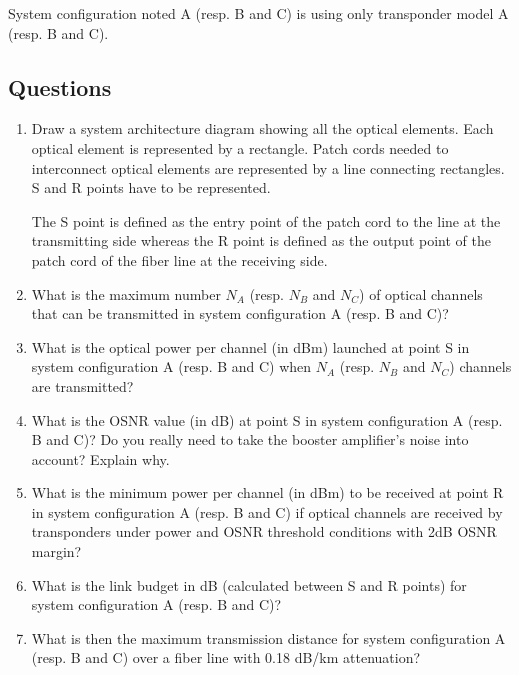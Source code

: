 \documentclass[a4paper,11pt]{article}
\begin{document}
System configuration noted A (resp. B and C) is using only transponder model A (resp. B and C).

\subsection*{Questions}

\begin{enumerate}
    \item Draw a system architecture diagram showing all the optical elements. Each optical element is represented by a rectangle. Patch cords needed to interconnect optical elements are represented by a line connecting rectangles. S and R points have to be represented.
    
    The S point is defined as the entry point of the patch cord to the line at the transmitting side whereas the R point is defined as the output point of the patch cord of the fiber line at the receiving side.
    
    \vspace{4cm}
    
    \item What is the maximum number $N_A$ (resp. $N_B$ and $N_C$) of optical channels that can be transmitted in system configuration A (resp. B and C)?
    
    \vspace{3cm}
    
    \item What is the optical power per channel (in dBm) launched at point S in system configuration A (resp. B and C) when $N_A$ (resp. $N_B$ and $N_C$) channels are transmitted?
    
    \vspace{3cm}
    
    \item What is the OSNR value (in dB) at point S in system configuration A (resp. B and C)? Do you really need to take the booster amplifier's noise into account? Explain why.
    
    \vspace{3cm}
    
    \item What is the minimum power per channel (in dBm) to be received at point R in system configuration A (resp. B and C) if optical channels are received by transponders under power and OSNR threshold conditions with 2dB OSNR margin?
    
    \vspace{3cm}
    
    \item What is the link budget in dB (calculated between S and R points) for system configuration A (resp. B and C)?
    
    \vspace{3cm}
    
    \item What is then the maximum transmission distance for system configuration A (resp. B and C) over a fiber line with 0.18 dB/km attenuation?
    
    \vspace{3cm}
\end{enumerate}
\end{document}

